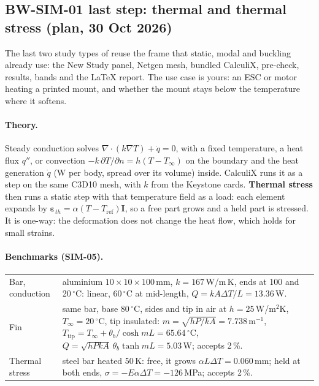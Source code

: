 \subsection{BW-SIM-01 last step: thermal and thermal stress (plan, 30 Oct 2026)}\label{sec:sim-thermal-plan}

The last two study types of  reuse the frame that static, modal and buckling already use: the New
Study panel, Netgen mesh, bundled CalculiX, pre-check, results, bands and the \LaTeX{} report. The use case is
yours: an ESC or motor heating a printed mount, and whether the mount stays below the temperature where it
softens.

\paragraph{Theory.} Steady conduction solves $\nabla\cdot(k\nabla T)+\dot q=0$, with a fixed temperature,
a heat flux $q''$, or convection $-k\,\partial T/\partial n=h(T-T_\infty)$ on the boundary and the heat
generation $\dot q$ (W per body, spread over its volume) inside. CalculiX runs it as a  step on the same C3D10 mesh, with $k$ from the Keystone cards. \textbf{Thermal stress} then
runs a static step with that temperature field as a load: each element expands by
$\boldsymbol\varepsilon_{th}=\alpha(T-T_{\text{ref}})\mathbf I$, so a free part grows and a held part is
stressed. It is one-way: the deformation does not change the heat flow, which holds for small strains.

\paragraph{Benchmarks (SIM-05).}
\begin{center}
\small
\begin{tabularx}{\linewidth}{@{}lX@{}}
\toprule
Bar, conduction & aluminium $10\times10\times100$\,mm, $k=167$\,W/m\,K, ends at 100 and 20\,$^\circ$C: linear,
  60\,$^\circ$C at mid-length, $Q=kA\Delta T/L=13.36$\,W.\\
Fin & same bar, base 80\,$^\circ$C, sides and tip in air at $h=25$\,W/m$^2$K, $T_\infty=20\,^\circ$C, tip
  insulated: $m=\sqrt{hP/kA}=7.738$\,m$^{-1}$, $T_{\text{tip}}=T_\infty+\theta_b/\cosh mL=65.64\,^\circ$C,
  $Q=\sqrt{hPkA}\,\theta_b\tanh mL=5.03$\,W; accepts 2\,\%.\\
Thermal stress & steel bar heated 50\,K: free, it grows $\alpha L\Delta T=0.060$\,mm; held at both ends,
  $\sigma=-E\alpha\Delta T=-126$\,MPa; accepts 2\,\%.\\
\bottomrule
\end{tabularx}
\end{center}

